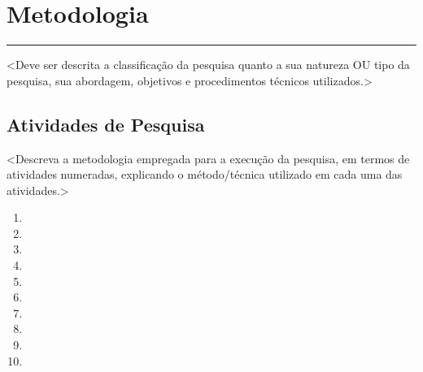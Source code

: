\section{Metodologia}

\vspace{-0.4cm}

\noindent\rule{\textwidth}{0.7pt}

<Deve ser descrita a classificação da pesquisa quanto a sua natureza OU tipo da pesquisa, sua abordagem, objetivos e procedimentos técnicos utilizados.>

\subsection{Atividades de Pesquisa}

<Descreva a metodologia empregada para a execução da pesquisa, em termos de atividades numeradas, explicando o método/técnica utilizado em cada uma das atividades.>

\begin{enumerate}
    \item 
    \item 
    \item 
    \item 
    \item 
    \item 
    \item 
    \item 
    \item 
    \item 
\end{enumerate}
